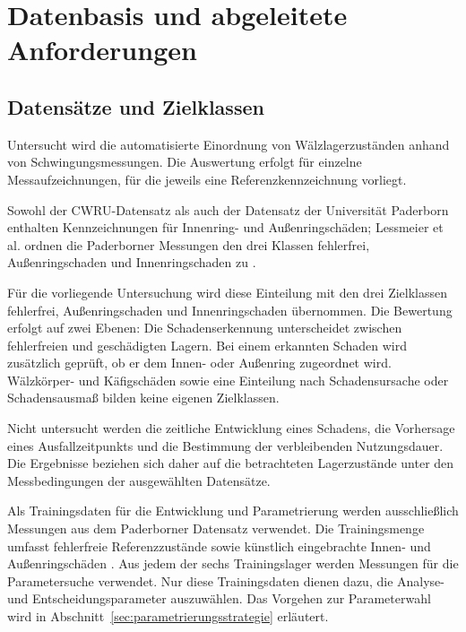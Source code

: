 \chapter{Datenbasis und abgeleitete Anforderungen}
\label{ch:datenbasis}

\section{Datensätze und Zielklassen}
\label{sec:untersuchungsrahmen}


Untersucht wird die automatisierte Einordnung von Wälzlagerzuständen anhand von
Schwingungsmessungen. Die Auswertung erfolgt für einzelne Messaufzeichnungen, für die
jeweils eine Referenzkennzeichnung vorliegt.

Sowohl der CWRU-Datensatz als auch der Datensatz der Universität Paderborn enthalten
Kennzeichnungen für Innenring- und Außenringschäden; Lessmeier et al. ordnen die
Paderborner Messungen den drei Klassen fehlerfrei, Außenringschaden und
Innenringschaden zu
\cite[S. 103, Abschn. 3.2 und Tab. 1]{smithRollingElementBearing2015}
\cite[S. 10--12, Abschn. 7]{lessmeierConditionMonitoringBearing2016}.

Für die vorliegende Untersuchung wird diese Einteilung mit den drei Zielklassen
fehlerfrei, Außenringschaden und Innenringschaden übernommen. Die Bewertung erfolgt auf
zwei Ebenen: Die Schadenserkennung unterscheidet zwischen fehlerfreien und geschädigten
Lagern. Bei einem erkannten Schaden wird zusätzlich geprüft, ob er dem Innen- oder
Außenring zugeordnet wird. Wälzkörper- und Käfigschäden sowie eine Einteilung nach
Schadensursache oder Schadensausmaß bilden keine eigenen Zielklassen.

Nicht untersucht werden die zeitliche Entwicklung eines Schadens, die Vorhersage eines
Ausfallzeitpunkts und die Bestimmung der verbleibenden Nutzungsdauer. Die Ergebnisse
beziehen sich daher auf die betrachteten Lagerzustände unter den Messbedingungen der
ausgewählten Datensätze.


Als Trainingsdaten für die Entwicklung und Parametrierung werden ausschließlich
Messungen aus dem Paderborner Datensatz verwendet. Die Trainingsmenge umfasst
fehlerfreie Referenzzustände sowie künstlich eingebrachte Innen- und
Außenringschäden
\cite[S.~5, Tab.~4; S.~8, Tab.~7]
{lessmeierConditionMonitoringBearing2016}.
Aus jedem der sechs Trainingslager werden Messungen für die Parametersuche verwendet.
Nur diese Trainingsdaten dienen dazu, die Analyse- und Entscheidungsparameter
auszuwählen. Das Vorgehen zur Parameterwahl wird in
Abschnitt~\ref{sec:parametrierungsstrategie} erläutert.

